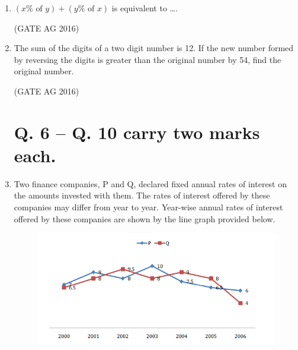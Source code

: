 \documentclass[journal]{IEEEtran}
\begin{document}
\begin{enumerate}
\medskip

\item 
$(x\% \text{ of } y) + (y\% \text{ of } x)$ is equivalent to \dots.

\begin{enumerate}
\end{enumerate}
\hfill(GATE AG 2016)\\

\medskip

\item 
The sum of the digits of a two digit number is 12. If the new number formed by reversing the digits is greater than the original number by 54, find the original number.

\begin{enumerate}
\end{enumerate}
\hfill(GATE AG 2016)\\

\medskip

\section*{Q. 6 -- Q. 10 carry two marks each.}

\item 
Two finance companies, P and Q, declared fixed annual rates of interest on the amounts invested with them. The rates of interest offered by these companies may differ from year to year. Year-wise annual rates of interest offered by these companies are shown by the line graph provided below.

\begin{figure}[H]
    \centering
    \includegraphics[width=0.5\columnwidth]{Figs/fig2.png}
    \caption{}
    \label{fig 1}
\end{figure}


\end{enumerate}
\end{document}
